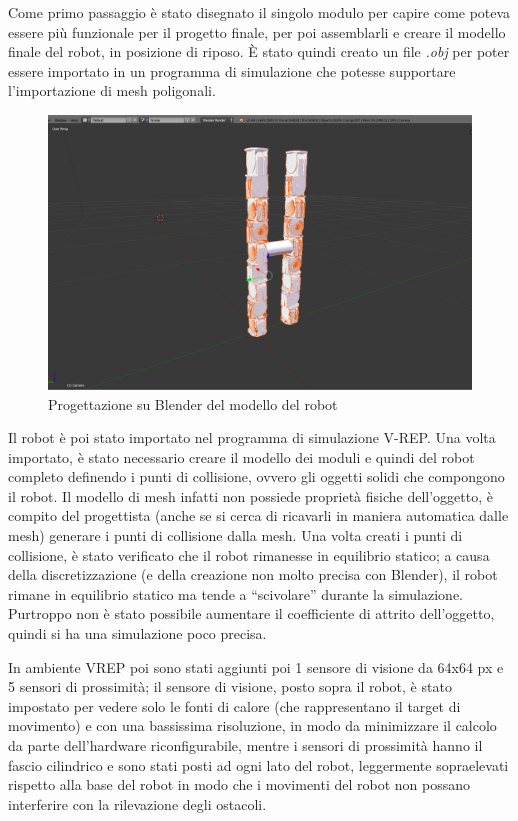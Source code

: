 \documentclass[11pt]{article} %
\begin{document}
Come primo passaggio è stato disegnato il singolo modulo per capire come poteva essere più funzionale per il progetto finale, per poi assemblarli e creare il modello finale del robot, in posizione di riposo. È stato quindi creato un file \textit{.obj} per poter essere importato in un programma di simulazione che potesse supportare l'importazione di mesh poligonali.

\begin{figure}[htbp]
\centering
\includegraphics[scale=0.2]{screen_blender.png}
\caption{Progettazione su Blender del modello del robot}\label{fig:9}
\end{figure}

Il robot è poi stato importato nel programma di simulazione V-REP. Una volta importato, è stato necessario creare il modello dei moduli e quindi del robot completo definendo i punti di collisione, ovvero gli oggetti solidi che compongono il robot. Il modello di mesh infatti non possiede proprietà fisiche dell'oggetto, è compito del progettista (anche se si cerca di ricavarli in maniera automatica dalle mesh) generare i punti di collisione dalla mesh.
Una volta creati i punti di collisione, è stato verificato che il robot rimanesse in equilibrio statico; a causa della discretizzazione (e della creazione non molto precisa con Blender), il robot rimane in equilibrio statico ma tende a ``scivolare'' durante la simulazione. Purtroppo non è stato possibile aumentare il coefficiente di attrito dell'oggetto, quindi si ha una simulazione poco precisa.

In ambiente VREP poi sono stati aggiunti poi 1 sensore di visione da 64x64 px e 5 sensori di prossimità; il sensore di visione, posto sopra il robot, è stato impostato per vedere solo le fonti di calore (che rappresentano il target di movimento) e con una bassissima risoluzione, in modo da minimizzare il calcolo da parte dell'hardware riconfigurabile, mentre i sensori di prossimità hanno il fascio cilindrico e sono stati posti ad ogni lato del robot, leggermente sopraelevati rispetto alla base del robot in modo che i movimenti del robot non possano interferire con la rilevazione degli ostacoli.
\end{document}
